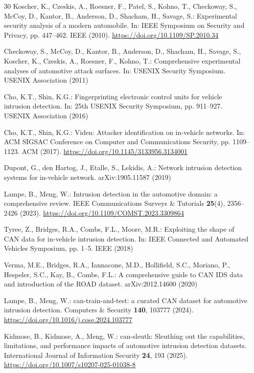 \documentclass[runningheads]{llncs}%
\providecommand{\doi}[1]{\url{https://doi.org/#1}}
\begin{document}
\begin{thebibliography}{30}
Koscher, K., Czeskis, A., Roesner, F., Patel, S., Kohno, T., Checkoway, S., McCoy, D., Kantor, B., Anderson, D., Shacham, H., Savage, S.: Experimental security analysis of a modern automobile. In: IEEE Symposium on Security and Privacy, pp. 447--462. IEEE (2010). \doi{10.1109/SP.2010.34}

Checkoway, S., McCoy, D., Kantor, B., Anderson, D., Shacham, H., Savage, S., Koscher, K., Czeskis, A., Roesner, F., Kohno, T.: Comprehensive experimental analyses of automotive attack surfaces. In: USENIX Security Symposium. USENIX Association (2011)

Cho, K.T., Shin, K.G.: Fingerprinting electronic control units for vehicle intrusion detection. In: 25th USENIX Security Symposium, pp. 911--927. USENIX Association (2016)

Cho, K.T., Shin, K.G.: Viden: Attacker identification on in-vehicle networks. In: ACM SIGSAC Conference on Computer and Communications Security, pp. 1109--1123. ACM (2017). \doi{10.1145/3133956.3134001}

Dupont, G., den Hartog, J., Etalle, S., Lekidis, A.: Network intrusion detection systems for in-vehicle network. arXiv:1905.11587 (2019)

Lampe, B., Meng, W.: Intrusion detection in the automotive domain: a comprehensive review. IEEE Communications Surveys \& Tutorials \textbf{25}(4), 2356--2426 (2023). \doi{10.1109/COMST.2023.3309864}

Tyree, Z., Bridges, R.A., Combs, F.L., Moore, M.R.: Exploiting the shape of CAN data for in-vehicle intrusion detection. In: IEEE Connected and Automated Vehicles Symposium, pp. 1--5. IEEE (2018)

Verma, M.E., Bridges, R.A., Iannacone, M.D., Hollifield, S.C., Moriano, P., Hespeler, S.C., Kay, B., Combs, F.L.: A comprehensive guide to CAN IDS data and introduction of the ROAD dataset. arXiv:2012.14600 (2020)

Lampe, B., Meng, W.: can-train-and-test: a curated CAN dataset for automotive intrusion detection. Computers \& Security \textbf{140}, 103777 (2024). \doi{10.1016/j.cose.2024.103777}

Kidmose, B., Kidmose, A., Meng, W.: can-sleuth: Sleuthing out the capabilities, limitations, and performance impacts of automotive intrusion detection datasets. International Journal of Information Security \textbf{24}, 193 (2025). \doi{10.1007/s10207-025-01038-8}


\end{thebibliography}
\end{document}
